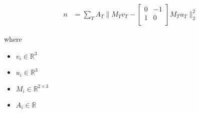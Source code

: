 \documentclass[12pt]{article}
\begin{document}
\begin{align*}
\textit{n} & = \sum_\textit{T} \textit{A}_{ \textit{T} }\|\textit{M}_{ \textit{T} }\textit{v}_{ \textit{T} } - \begin{bmatrix}
0 & -1\\
1 & 0\\
\end{bmatrix}\textit{M}_{ \textit{T} }\textit{u}_{ \textit{T} }\|_2^{2}
\end{align*}

where
\begin{itemize}
\item $\textit{v}_{\textit{i}} \in \mathbb{R}^{ 3}$
\item $\textit{u}_{\textit{i}} \in \mathbb{R}^{ 3}$
\item $\textit{M}_{\textit{i}} \in \mathbb{R}^{ 2 \times 3 }$
\item $\textit{A}_{\textit{i}} \in \mathbb{{R}}$
\end{itemize}
\end{document}
